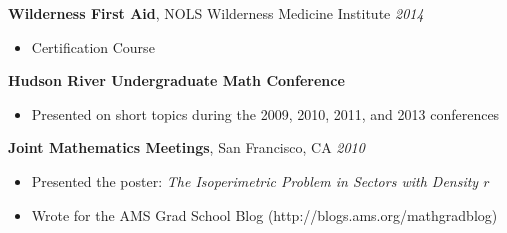 \documentclass[margin]{res}
\begin{document}
\begin{resume}
	{\bf Wilderness First Aid}, NOLS Wilderness Medicine Institute \hfill {\sl 2014}
	\begin{itemize}  \itemsep -2pt
	\item Certification Course
	\end{itemize}

	{\bf Hudson River Undergraduate Math Conference}
	\begin{itemize}  \itemsep -2pt
	\item Presented on short topics during the 2009, 2010, 2011, and 2013 conferences
	\end{itemize}

	{\bf Joint Mathematics Meetings}, San Francisco, CA \hfill {\sl 2010}
	\begin{itemize}  \itemsep -2pt
	\item Presented the poster: {\sl The Isoperimetric Problem in Sectors with Density $r$}
	\item Wrote for the AMS Grad School Blog (http://blogs.ams.org/mathgradblog)
	\end{itemize}	
 
\end{resume}
\end{document}
